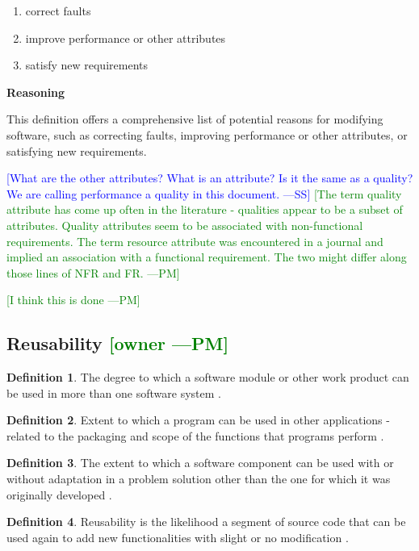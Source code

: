 \documentclass[letterpaper,cleveref]{lipics-v2019}
\newcommand{\authornote}[3]{\textcolor{#1}{[#3 ---#2]}}
\newcommand{\authornote}[3]{}
\newcommand{\wss}[1]{\authornote{blue}{SS}{#1}} %
\newcommand{\pmi}[1]{\authornote{green}{PM}{#1}} %
\theoremstyle{definition}
\newtheorem{defn}{Definition}
\begin{document}
\begin{enumerate}
	\item correct faults
	\item improve performance or other
	attributes
	\item satisfy new requirements
\end{enumerate}

\noindent \textbf{Reasoning}

This definition offers a comprehensive list of potential reasons for modifying
software, such as correcting faults, improving performance or other attributes,
or satisfying new requirements.

\wss{What are the other attributes?  What is an attribute?  Is it the
	same as a quality?  We are calling performance a quality in this document.}
\pmi{The term quality attribute has come up often in the literature - qualities
	appear to be a subset of attributes. Quality attributes seem to be associated
	with non-functional requirements. The term resource attribute was encountered in
	a journal and implied an association with a functional requirement. The two
	might differ along those lines of NFR and FR.}

\pmi{I think this is done}

\subsection{{Reusability} \pmi{owner}}

\begin{defn} 
  The degree to which a software module or other work product can be used in
  more than one software system \citep{IEEEStdGlossarySET1990}.
\end{defn}
\begin{defn}
  Extent to which a program can be used in other applications - related to the packaging and scope of the functions that programs perform \citep{McCallEtAl1977}. 
\end{defn}
\begin{defn} \label{ReusabilityDefnSelected} 
  The extent to which a software component can be used with or without
  adaptation in a problem solution other than the one for which it was
  originally developed \citep{kalagiakos2003non}.
\end{defn}
\begin{defn}
  Reusability is the likelihood a segment of source code that can be used again
  to add new functionalities with slight or no modification
  \citep{sandhu2010survey}.
\end{defn}
\end{document}
